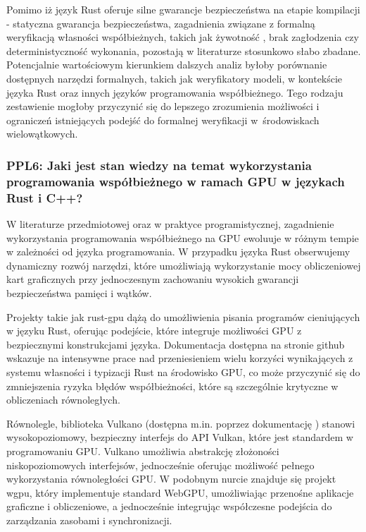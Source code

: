 \begin{itemize}
    Pomimo iż język Rust oferuje silne gwarancje bezpieczeństwa na etapie kompilacji - statyczna gwarancja bezpieczeństwa, zagadnienia związane z formalną weryfikacją własności współbieżnych, takich jak żywotność , brak zagłodzenia  czy deterministyczność wykonania, pozostają w literaturze stosunkowo słabo zbadane. Potencjalnie wartościowym kierunkiem dalszych analiz byłoby porównanie dostępnych narzędzi formalnych, takich jak weryfikatory modeli, w kontekście języka Rust oraz innych języków programowania współbieżnego. Tego rodzaju zestawienie mogłoby przyczynić się do lepszego zrozumienia możliwości i ograniczeń istniejących podejść do formalnej weryfikacji w~środowiskach wielowątkowych.
\end{itemize}


\subsubsection{PPL6: Jaki jest stan wiedzy na temat wykorzystania programowania współbieżnego w ramach GPU w językach Rust i C++?}
W literaturze przedmiotowej oraz w praktyce programistycznej, zagadnienie wykorzystania programowania współbieżnego na GPU ewoluuje w różnym tempie w zależności od języka programowania. W przypadku języka Rust obserwujemy dynamiczny rozwój narzędzi, które umożliwiają wykorzystanie mocy obliczeniowej kart graficznych przy jednoczesnym zachowaniu wysokich gwarancji bezpieczeństwa pamięci i wątków.

Projekty takie jak rust-gpu \cite{rustgpuRust} dążą do umożliwienia pisania programów cieniujących w języku Rust, oferując podejście, które integruje możliwości GPU z bezpiecznymi konstrukcjami języka. Dokumentacja dostępna na stronie github \cite{rustgpuRust} wskazuje na intensywne prace nad przeniesieniem wielu korzyści wynikających z systemu własności i typizacji Rust na środowisko GPU, co może przyczynić się do zmniejszenia ryzyka błędów współbieżności, które są szczególnie krytyczne w obliczeniach równoległych.

Równolegle, biblioteka Vulkano (dostępna m.in. poprzez dokumentację \cite{docsVulkanoRust}) stanowi wysokopoziomowy, bezpieczny interfejs do API Vulkan, które jest standardem w programowaniu GPU. Vulkano umożliwia abstrakcję złożoności niskopoziomowych interfejsów, jednocześnie oferując możliwość pełnego wykorzystania równoległości GPU. W podobnym nurcie znajduje się projekt wgpu, który implementuje standard WebGPU, umożliwiając przenośne aplikacje graficzne i obliczeniowe, a jednocześnie integrując współczesne podejścia do zarządzania zasobami i synchronizacji.

